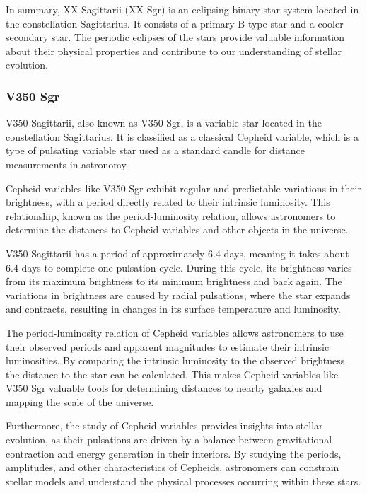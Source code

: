 In summary, XX Sagittarii (XX Sgr) is an eclipsing binary star system located in the constellation Sagittarius. It consists of a primary B-type star and a cooler secondary star. The periodic eclipses of the stars provide valuable information about their physical properties and contribute to our understanding of stellar evolution.





\subsubsection*{ V350 Sgr }

V350 Sagittarii, also known as V350 Sgr, is a variable star located in the constellation Sagittarius. It is classified as a classical Cepheid variable, which is a type of pulsating variable star used as a standard candle for distance measurements in astronomy.

Cepheid variables like V350 Sgr exhibit regular and predictable variations in their brightness, with a period directly related to their intrinsic luminosity. This relationship, known as the period-luminosity relation, allows astronomers to determine the distances to Cepheid variables and other objects in the universe.

V350 Sagittarii has a period of approximately 6.4 days, meaning it takes about 6.4 days to complete one pulsation cycle. During this cycle, its brightness varies from its maximum brightness to its minimum brightness and back again. The variations in brightness are caused by radial pulsations, where the star expands and contracts, resulting in changes in its surface temperature and luminosity.

The period-luminosity relation of Cepheid variables allows astronomers to use their observed periods and apparent magnitudes to estimate their intrinsic luminosities. By comparing the intrinsic luminosity to the observed brightness, the distance to the star can be calculated. This makes Cepheid variables like V350 Sgr valuable tools for determining distances to nearby galaxies and mapping the scale of the universe.

Furthermore, the study of Cepheid variables provides insights into stellar evolution, as their pulsations are driven by a balance between gravitational contraction and energy generation in their interiors. By studying the periods, amplitudes, and other characteristics of Cepheids, astronomers can constrain stellar models and understand the physical processes occurring within these stars.

